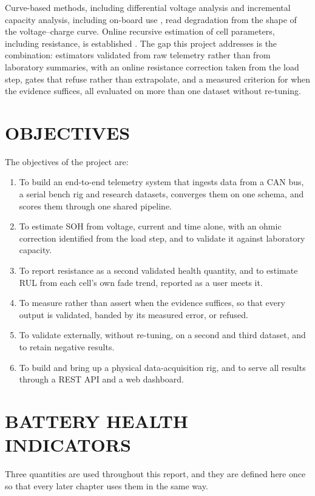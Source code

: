 \documentclass[12pt,a4paper]{amritareport}
\begin{document}
Curve-based methods, including differential voltage analysis \cite{bloom2005} and incremental capacity analysis, including on-board use \cite{weng2013}, read degradation from the shape of the voltage--charge curve. Online recursive estimation of cell parameters, including resistance, is established \cite{plett2004}. The gap this project addresses is the combination: estimators validated from raw telemetry rather than from laboratory summaries, with an online resistance correction taken from the load step, gates that refuse rather than extrapolate, and a measured criterion for when the evidence suffices, all evaluated on more than one dataset without re-tuning.

\section{OBJECTIVES}

The objectives of the project are:

\begin{enumerate}
    \item To build an end-to-end telemetry system that ingests data from a CAN bus, a serial bench rig and research datasets, converges them on one schema, and scores them through one shared pipeline.
    \item To estimate SOH from voltage, current and time alone, with an ohmic correction identified from the load step, and to validate it against laboratory capacity.
    \item To report resistance as a second validated health quantity, and to estimate RUL from each cell's own fade trend, reported as a user meets it.
    \item To measure rather than assert when the evidence suffices, so that every output is validated, banded by its measured error, or refused.
    \item To validate externally, without re-tuning, on a second and third dataset, and to retain negative results.
    \item To build and bring up a physical data-acquisition rig, and to serve all results through a REST API and a web dashboard.
\end{enumerate}

\section{BATTERY HEALTH INDICATORS}

Three quantities are used throughout this report, and they are defined here once so that every later chapter uses them in the same way.
\end{document}
